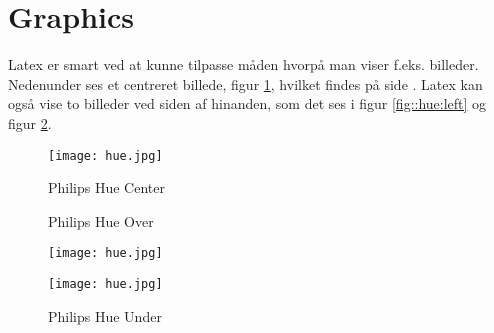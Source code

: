 \section{Graphics}
Latex er smart ved at kunne tilpasse måden hvorpå man viser f.eks. billeder. Nedenunder ses et centreret billede, figur \ref{fig::hue:top}, hvilket findes på side \pageref{fig::hue:top}. Latex kan også vise to billeder ved siden af hinanden, som det ses i figur \ref{fig::hue:left} og figur \ref{fig::hue:right}.
\begin{figure}[ht]
    \centering
    \texttt{[image: hue.jpg]}
    \caption{Philips Hue Center}
    \label{fig::hue:top}
\end{figure}
\begin{figure}[ht]
    \centering
    \begin{minipage}{0.4\textwidth}
        \caption{Philips Hue Over}
        \texttt{[image: hue.jpg]}
        \label{fig::hue:left}
    \end{minipage}
    \hfill
    \begin{minipage}{0.4\textwidth}
        \texttt{[image: hue.jpg]}
        \caption{Philips Hue Under}
        \label{fig::hue:right}
    \end{minipage}
\end{figure}